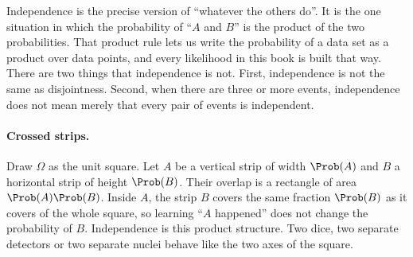 Independence is the precise version of ``whatever the others do''. It is the
one situation in which the probability of ``$A$ and $B$'' is the product of the
two probabilities. That product rule lets us write the probability of a data
set as a product over data points, and every likelihood in this book is built
that way. There are two things that independence is not. First, independence is not the same as disjointness. Second, when there are three or more events, independence does not mean merely that every pair of events is independent.

\paragraph{Crossed strips.}
Draw $\Omega$ as the unit square. Let $A$ be a vertical strip of width
$\Prob(A)$ and $B$ a horizontal strip of height $\Prob(B)$. Their overlap is a
rectangle of area $\Prob(A)\Prob(B)$. Inside $A$, the strip $B$ covers the same
fraction $\Prob(B)$ as it covers of the whole square, so learning ``$A$
happened'' does not change the probability of $B$. Independence is this
product structure. Two dice, two separate detectors or two separate nuclei
behave like the two axes of the square.

